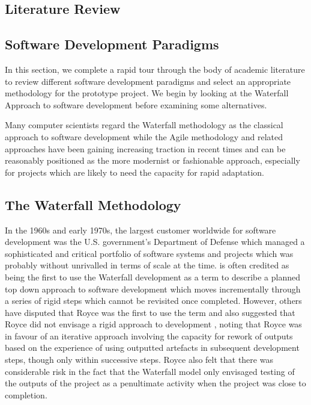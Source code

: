 \documentclass[a4paper,12pt]{article}
\begin{document}
\begin{samepage}
\begin{samepage}
\section {Literature Review}
\subsection{Software Development Paradigms}

In this section, we complete a rapid tour through the body of academic literature to review different software development paradigms and select an appropriate methodology for the prototype project. We begin by looking at the Waterfall Approach to software development before examining some alternatives. 

Many computer scientists regard the Waterfall methodology as the classical approach to software development while the Agile methodology and related approaches have been gaining increasing traction in recent times and can be reasonably positioned as the more modernist or fashionable approach, especially for projects which are likely to need the capacity for rapid adaptation.

\subsection {The Waterfall Methodology}

In the 1960s and early 1970s, the largest customer worldwide for software development was the U.S. government's Department of Defense which managed a sophisticated and critical portfolio of software systems and projects which was probably without unrivalled in terms of scale at the time.  \parencite{royce} is often credited as being the first to use the Waterfall development as a term to describe a planned top down approach to software development which moves incrementally through a series of rigid steps which cannot be revisited once completed. However, others have disputed that Royce was the first to use the term and  also suggested that Royce did not envisage a rigid approach to development , noting that Royce was in favour of an iterative approach involving the capacity for rework of outputs based on the experience of using outputted artefacts in subsequent development steps, though only within successive steps. Royce also felt that there was considerable risk in the fact that the Waterfall model only envisaged testing of the outputs of the project as a penultimate activity when the project was close to completion.


\end{samepage}
\end{samepage}
\end{document}
